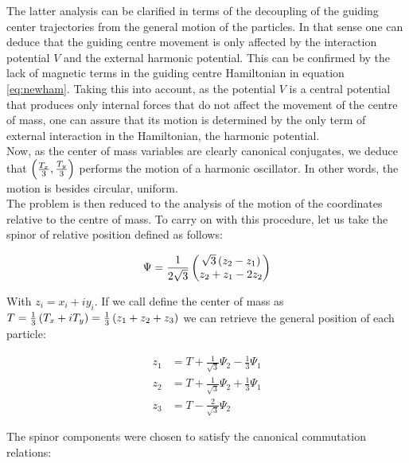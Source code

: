 The latter analysis can be clarified in terms of the decoupling of the guiding center trajectories from the general motion of the particles. In that sense one can deduce that the guiding centre movement is only affected by the interaction potential $V$ and the external harmonic potential. This can be confirmed by the lack of magnetic terms in the guiding centre Hamiltonian in equation \eqref{eq:newham}. Taking this into account, as the potential $V$ is a central potential that produces only internal forces that do not affect the movement of the centre of mass, one can assure that its motion is determined by the only term of external interaction in the Hamiltonian, the harmonic potential.\\

Now, as the center of mass variables are clearly canonical conjugates, we deduce that $\left( \frac{T_x}{3},\frac{T_y}{3} \right)$ performs the motion of a harmonic oscillator. In other words, the motion is besides circular, uniform. \\

The problem is then reduced to the analysis of the motion of the coordinates relative to the centre of mass. To carry on with this procedure, let us take the spinor of relative position defined as follows:

\begin{align}
\Psi = \frac{1}{2\sqrt{3}}\begin{pmatrix}\sqrt{3}\left( z_{2}-z_{1} \right)\\
z_{2}+z_{1}-2z_{2}\end{pmatrix}
\label{eq:spinor}
\end{align}

With $z_{i} = x_i + iy_i$. If we call define the center of mass as $T = \frac{1}{3}\left( T_x + iT_y \right) = \frac{1}{3}\left( z_1 +z_2+z_3 \right)$ we can retrieve the general position of each particle:

\small
\begin{equation}
\begin{aligned}
z_1 &= T+\frac{1}{\sqrt{3}}\Psi_2 - \frac{1}{3}\Psi_1 \\
z_2 &= T+\frac{1}{\sqrt{3}}\Psi_2 + \frac{1}{3}\Psi_1 \\
z_3 &= T-\frac{2}{\sqrt{3}}\Psi_2
\end{aligned}
\label{eq:singlevecs}
\end{equation}
\normalsize

The spinor components were chosen to satisfy the canonical commutation relations:

